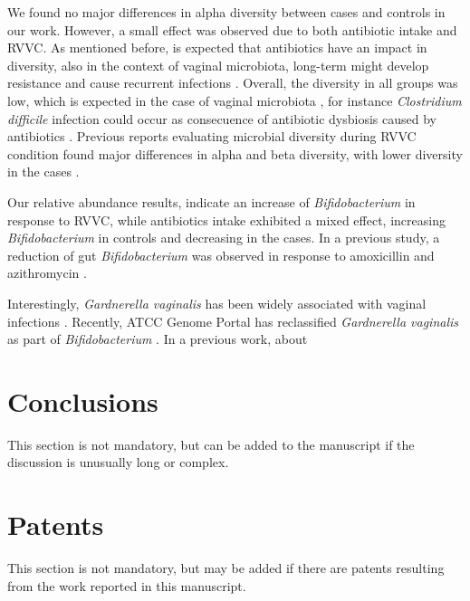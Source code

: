 \documentclass[biotech,article,submit,pdftex,moreauthors]{Definitions/mdpi}
\begin{document}
We found no major differences in alpha diversity between cases and controls in our work. However, a small effect was observed due to both antibiotic intake and RVVC. As mentioned before, is expected that antibiotics have an impact in diversity, also in the context of vaginal microbiota, long-term might develop resistance and cause recurrent infections \cite{@lev-sagieVaginalMicrobiomeTransplantation2019}. Overall, the diversity in all groups was low, which is expected in the case of vaginal microbiota \cite{@sunVulvovaginalCandidiasisVaginal2023}, for instance \textit{Clostridium difficile} infection could occur as consecuence of antibiotic dysbiosis caused by antibiotics \cite{@theriotAntibioticinducedShiftsMouse2014}. Previous reports evaluating microbial diversity during RVVC condition found major differences in alpha and beta diversity, with lower diversity in the cases \cite{@ceccaraniDiversityVaginalMicrobiome2019; @liuDiverseVaginalMicrobiomes2013}.

Our relative abundance results, indicate an increase of \textit{Bifidobacterium} in response to RVVC, while antibiotics intake exhibited a mixed effect, increasing \textit{Bifidobacterium} in controls and decreasing in the cases. In a previous study, a reduction of gut \textit{Bifidobacterium} was observed in response to amoxicillin and azithromycin \cite{@chopykCommonAntibioticsAzithromycin2023a}. 

Interestingly, \textit{Gardnerella vaginalis} has been widely associated with vaginal infections
\cite{@morrillGardnerellaVaginalisCause2020; @bagnallBacterialVaginosisPractical2017}. Recently, ATCC Genome Portal has reclassified \textit{Gardnerella vaginalis} as part of \textit{Bifidobacterium} \cite{@ReclassificationBifidobacteriumGardnerella}. In a previous work, about 


\section{Conclusions}

This section is not mandatory, but can be added to the manuscript if the discussion is unusually long or complex.

\section{Patents}

This section is not mandatory, but may be added if there are patents resulting from the work reported in this manuscript.
\end{document}
